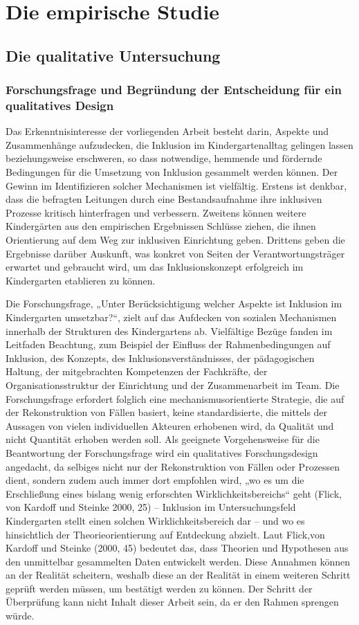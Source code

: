 \part{Die empirische Studie}
\chapter{Die qualitative Untersuchung}
\section{Forschungsfrage und Begründung der Entscheidung für ein qualitatives Design}
Das Erkenntnisinteresse der vorliegenden Arbeit besteht darin, Aspekte und Zusammenhänge aufzudecken, die Inklusion im Kindergartenalltag gelingen lassen beziehungsweise erschweren, so dass notwendige, hemmende und fördernde Bedingungen für die Umsetzung von Inklusion gesammelt werden können. Der Gewinn im Identifizieren solcher Mechanismen ist vielfältig. Erstens ist denkbar, dass die befragten Leitungen durch eine Bestandsaufnahme ihre inklusiven Prozesse kritisch hinterfragen und verbessern. Zweitens können weitere Kindergärten aus den empirischen Ergebnissen Schlüsse ziehen, die ihnen Orientierung auf dem Weg zur inklusiven Einrichtung geben. Drittens geben die Ergebnisse darüber Auskunft, was konkret von Seiten der Verantwortungsträger erwartet und gebraucht wird, um das Inklusionskonzept erfolgreich im Kindergarten etablieren zu können.

Die Forschungsfrage, „Unter Berücksichtigung welcher Aspekte ist Inklusion im Kindergarten umsetzbar?“, zielt auf das Aufdecken von sozialen Mechanismen innerhalb der Strukturen des Kindergartens ab. Vielfältige Bezüge fanden im Leitfaden Beachtung, zum Beispiel der Einfluss der Rahmenbedingungen auf Inklusion, des Konzepts, des Inklusionsverständnisses, der pädagogischen Haltung, der mitgebrachten Kompetenzen der Fachkräfte, der Organisationsstruktur der Einrichtung und der Zusammenarbeit im Team. 
Die Forschungsfrage erfordert folglich eine mechanismusorientierte Strategie, die auf der Rekonstruktion von Fällen basiert, keine  standardisierte, die mittels der Aussagen von vielen individuellen Akteuren erhobenen wird, da Qualität und nicht Quantität erhoben werden soll. Als geeignete Vorgehensweise für die Beantwortung der Forschungsfrage wird ein  
qualitatives Forschungsdesign angedacht, da selbiges nicht nur der Rekonstruktion von Fällen oder Prozessen dient, sondern zudem auch immer dort empfohlen wird, „wo es um die Erschließung eines bislang wenig erforschten Wirklichkeitsbereichs“ geht (Flick, von Kardoff und Steinke 2000, 25) -- Inklusion im Untersuchungsfeld Kindergarten stellt einen solchen Wirklichkeitsbereich dar -- und wo es hinsichtlich der Theorieorientierung auf Entdeckung abzielt.
Laut Flick,von Kardoff und Steinke (2000, 45) bedeutet das, dass Theorien und Hypothesen aus den unmittelbar gesammelten Daten entwickelt werden. Diese Annahmen können an der Realität scheitern, weshalb diese an der Realität in einem weiteren Schritt geprüft werden müssen, um bestätigt werden zu können. Der Schritt der Überprüfung kann nicht Inhalt dieser Arbeit sein, da er den Rahmen sprengen würde.  

